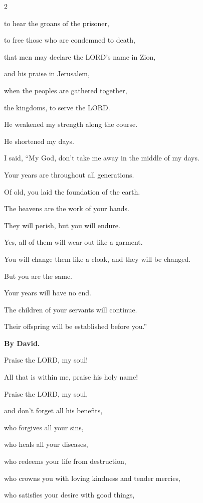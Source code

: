 \begin{multicols}{2}
	
	\myverse{}to hear the groans of the prisoner,
	
	to free those who are condemned to death,
	
	
	\myverse{}that men may declare the LORD’s name in Zion,
	
	and his praise in Jerusalem,
	
	
	\myverse{}when the peoples are gathered together,
	
	the kingdoms, to serve the LORD.
	
	\vspace{\baselineskip}
	
	\myverse{}He weakened my strength along the course.
	
	He shortened my days.
	
	
	\myverse{}I said, “My God, don’t take me away in the middle of my days.
	
	Your years are throughout all generations.
	
	
	\myverse{}Of old, you laid the foundation of the earth.
	
	The heavens are the work of your hands.
	
	
	\myverse{}They will perish, but you will endure.
	
	Yes, all of them will wear out like a garment.
	
	You will change them like a cloak, and they will be changed.
	
	
	\myverse{}But you are the same.
	
	Your years will have no end.
	
	
	\myverse{}The children of your servants will continue.
	
	Their offspring will be established before you.”
	
	
	\mychapter{}\textbf{By David.}
	
	\quad\quad\quad \myverse*{}Praise the LORD, my soul!
	
	All that is within me, praise his holy name!
	
	
	\myverse{}Praise the LORD, my soul,
	
	and don’t forget all his benefits,
	
	
	\myverse{}who forgives all your sins,
	
	who heals all your diseases,
	
	
	\myverse{}who redeems your life from destruction,
	
	who crowns you with loving kindness and tender mercies,
	
	
	\myverse{}who satisfies your desire with good things,
	

\end{multicols}
